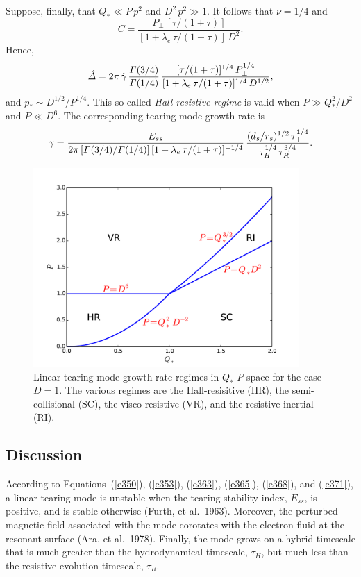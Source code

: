 \documentclass[notitlepage,12pt]{article}
\begin{document}
Suppose, finally, that $Q_\ast \ll P\,p^2$ and $D^2\,p^2\gg 1$. It follows that $\nu=1/4$ and
\begin{equation}
C = \frac{P_\perp\,[\tau/(1+\tau)]}{[1+\lambda_e\,\tau/(1+\tau)]\,D^2}.
\end{equation}
Hence,
\begin{equation} 
\hat{\mit\Delta} = 2\pi\,\hat{\gamma}\,\frac{{\mit\Gamma}(3/4)}{{\mit\Gamma}(1/4)}\,\frac{[\tau/(1+\tau)]^{1/4}\,P_\perp^{1/4}}{[1+\lambda_e\,\tau/(1+\tau)]^{1/4}\,D^{1/2}},
\end{equation}
and $p_\ast \sim D^{1/2}/P^{1/4}$. This so-called {\em Hall-resistive regime}\/ is valid when $P\gg Q_\ast^2/D^2$ and
$P\ll D^6$. The corresponding tearing mode growth-rate is 
\begin{equation}\label{e371}
\gamma= \frac{E_{ss}}{2\pi\,[{\mit\Gamma}(3/4)/{\mit\Gamma}(1/4)]\,[1+\lambda_e\,\tau/(1+\tau)]^{-1/4}}\,\frac{(d_s/r_s)^{1/2}\,\tau_\perp^{1/4}}{\tau_H^{1/4}\,\tau_R^{3/4}}.
\end{equation}

\begin{figure}
\centerline{\includegraphics[width=0.9\textwidth]{RegimeIII.pdf}}
\caption{Linear tearing mode growth-rate regimes  in $Q_\ast$-$P$ space for the case $D=1$. The various regimes are
the Hall-resisitive (HR), the semi-collisional (SC),  the visco-resistive (VR), and the resistive-inertial (RI).}\label{f3}
\end{figure}

\subsection{Discussion}
According to Equations~(\ref{e350}), (\ref{e353}), (\ref{e363}), (\ref{e365}), (\ref{e368}), and (\ref{e371}), a linear tearing mode is unstable when the tearing stability index, $E_{ss}$, is positive, and is stable otherwise (Furth, et al.\ 1963).
Moreover, the perturbed magnetic field associated with the mode corotates with the electron fluid at the resonant surface (Ara, et al.\ 1978). Finally,
the mode grows on a hybrid timescale that is much greater than the hydrodynamical timescale, $\tau_H$,
but much less than the resistive evolution timescale, $\tau_R$. 
\end{document}
